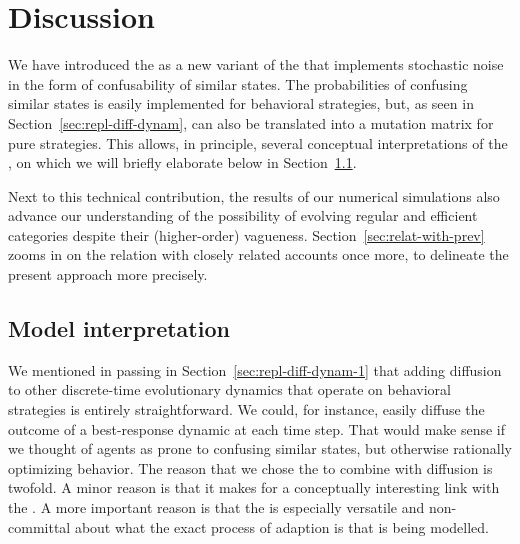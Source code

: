 \section{Discussion}
\label{sec:discussion}

We have introduced the \rdd as a new variant of the \rmd that
implements stochastic noise in the form of confusability of similar
states. The probabilities of confusing similar states is easily
implemented for behavioral strategies, but, as seen in
Section~\ref{sec:repl-diff-dynam}, can also be translated into a
mutation matrix for pure strategies. This allows, in principle,
several conceptual interpretations of the \rdd, on which we will
briefly elaborate below in Section~\ref{sec:model-interpretation}.

Next to this technical contribution, the results of our numerical
simulations also advance our understanding of the possibility of
evolving regular and efficient categories despite their (higher-order)
vagueness. Section~\ref{sec:relat-with-prev} zooms in on the relation
with closely related accounts once more, to delineate the present
approach more precisely.

\subsection{Model interpretation}
\label{sec:model-interpretation}

We mentioned in passing in Section~\ref{sec:repl-diff-dynam-1} that
adding diffusion to other discrete-time evolutionary dynamics that
operate on behavioral strategies is entirely straightforward. We
could, for instance, easily diffuse the outcome of a best-response
dynamic at each time step. That would make sense if we thought of
agents as prone to confusing similar states, but otherwise rationally
optimizing behavior. The reason that we chose the \rd to combine with
diffusion is twofold. A minor reason is that it makes for a
conceptually interesting link with the \rmd. A more important reason
is that the \rd is especially versatile and non-committal about what
the exact process of adaption is that is being modelled.

